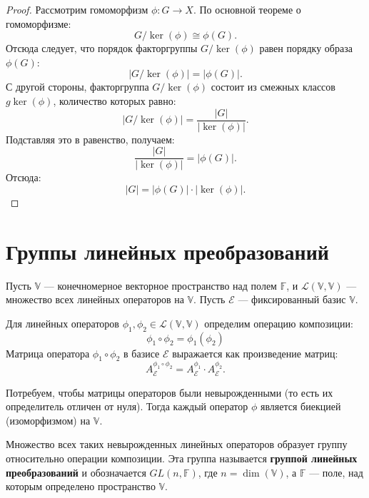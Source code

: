 \begin{proof}
    Рассмотрим гомоморфизм \( \phi: G \to X \). По основной теореме о гомоморфизме:
    \[
    G / \ker(\phi) \cong \phi(G).
    \]
    Отсюда следует, что порядок факторгруппы \( G / \ker(\phi) \) равен порядку образа \( \phi(G) \):
    \[
    |G / \ker(\phi)| = |\phi(G)|.
    \]
    С другой стороны, факторгруппа \( G / \ker(\phi) \) состоит из смежных классов \( g \ker(\phi) \), количество которых равно:
    \[
    |G / \ker(\phi)| = \frac{|G|}{|\ker(\phi)|}.
    \]
    Подставляя это в равенство, получаем:
    \[
    \frac{|G|}{|\ker(\phi)|} = |\phi(G)|.
    \]
    Отсюда:
    \[
    |G| = |\phi(G)| \cdot |\ker(\phi)|.
    \]
\end{proof}

\section{Группы линейных преобразований}

\begin{shdef}
    \begin{definition}
    
    Пусть \( \mathbb{V} \) — конечномерное векторное пространство над полем \( \mathbb{F} \), и \( \mathcal{L}(\mathbb{V}, \mathbb{V}) \) — множество всех линейных операторов на \( \mathbb{V} \). Пусть \( \mathcal{E} \) — фиксированный базис \( \mathbb{V} \). 

    Для линейных операторов \( \phi_1, \phi_2 \in \mathcal{L}(\mathbb{V}, \mathbb{V}) \) определим операцию композиции:
    \[
    \phi_1 \circ \phi_2 = \phi_1(\phi_2)
    \]
    Матрица оператора \( \phi_1 \circ \phi_2 \) в базисе \( \mathcal{E} \) выражается как произведение матриц:
    \[
    A_{\mathcal{E}}^{\phi_1 \circ \phi_2} = A_{\mathcal{E}}^{\phi_1} \cdot A_{\mathcal{E}}^{\phi_2}.
    \]

    Потребуем, чтобы матрицы операторов были невырожденными (то есть их определитель отличен от нуля). Тогда каждый оператор \( \phi \) является биекцией (изоморфизмом) на \( \mathbb{V} \). 

    Множество всех таких невырожденных линейных операторов образует группу относительно операции композиции. Эта группа называется \textbf{группой линейных преобразований} и обозначается \( GL(n, \mathbb{F}) \), где \( n = \dim(\mathbb{V}) \), а \( \mathbb{F} \) — поле, над которым определено пространство \( \mathbb{V} \).
    \end{definition}
\end{shdef}

